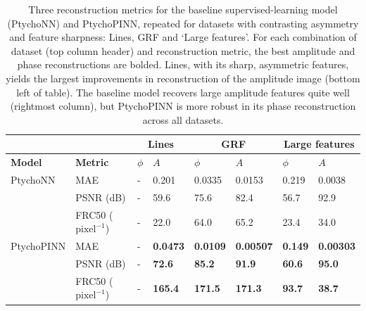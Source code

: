 \documentclass[sn-mathphys]{sn-jnl}%
\theoremstyle{thmstyleone}%
\theoremstyle{thmstyletwo}%
\theoremstyle{thmstylethree}%
\begin{document}
\begin{table}[h]
\begin{center}
\caption{Three reconstruction metrics for the baseline supervised-learning model (PtychoNN) and PtychoPINN, repeated for datasets with contrasting asymmetry and feature sharpness: Lines, GRF and `Large features'. For each combination of dataset (top column header) and reconstruction metric, the best amplitude and phase reconstructions are bolded. Lines, with its sharp, asymmetric features, yields the largest improvements in reconstruction of the amplitude image (bottom left of table). The baseline model recovers large amplitude features quite well (rightmost column), but PtychoPINN is more robust in its phase reconstruction across all datasets.  
}\label{tab1}
\begin{tabular}{p{2cm}l|ll|ll|ll}
\toprule
& \multicolumn{1}{c}{} & \multicolumn{2}{c}{Lines} & \multicolumn{2}{c}{GRF} & \multicolumn{2}{c}{Large features}\\
\midrule
\bf{Model} & \bf{Metric}
& $\phi$ & $A$
& $\phi$ & $A$
& $\phi$ & $A$ \\
\midrule
PtychoNN%
& MAE & - & 0.201 & 0.0335 & 0.0153 & 0.219 & 0.0038 \\
& PSNR (dB) & - & 59.6 & 75.6 & 82.4 & 56.7 & 92.9 \\
& FRC50 ($\mathrm{pixel}^{-1}$) & - & 22.0 & 64.0 & 65.2 & 23.4 & 34.0 \\
\midrule
PtychoPINN%
& MAE & - & \textbf{0.0473} & \textbf{0.0109} & \textbf{0.00507} & \textbf{0.149} & \textbf{0.00303} \\
& PSNR (dB) & - & \textbf{72.6} & \textbf{85.2} & \textbf{91.9} & \textbf{60.6} & \textbf{95.0} \\
& FRC50 ($\mathrm{pixel}^{-1}$) & - & \textbf{165.4} & \textbf{171.5} & \textbf{171.3} & \textbf{93.7} & \textbf{38.7} \\
\midrule
\end{tabular}
\end{center}
\end{table}
\end{document}
